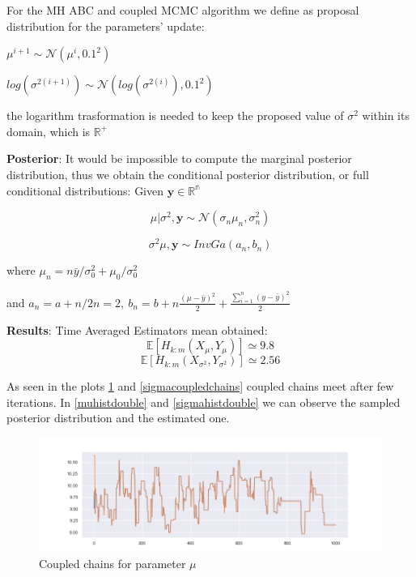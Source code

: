 \documentclass[11pt,a4paper,oneside]{report}
\begin{document}
For the MH ABC and coupled MCMC algorithm we define as proposal distribution for the parameters' update:
\begin{center}
	$ \mu^{i+1} \sim	\mathcal{N}( \mu^{i}, 0.1^2) $
	
	$ log(\sigma^{2(i+1)}) \sim \mathcal{N}( log(\sigma^{2(i)}), 0.1^2) $
\end{center}
the logarithm trasformation is needed to keep the proposed value of $ \sigma^2$ within its domain, 
which is $\mathbb{R^{+}}$


	
\textbf{Posterior}:
It would be impossible to compute the marginal posterior distribution, thus we obtain the conditional posterior distribution, or full conditional distributions:
Given $\mathbf{y} \in \mathbb{R^{n}} $

	
	$$ \mu| \sigma^2,\mathbf{y} \sim	\mathcal{N}( \sigma_n\mu_n, \sigma_n^2) $$
	
	$$ \sigma^{2} \mu,\mathbf{y} \sim InvGa( a_n,b_n)$$
	
	where $ \mu_n= n\bar y/\sigma_0^2 + \mu_0/\sigma_0^2$
		
and $a_n= a + n/2n=2, \  b_n=b + n\frac{(\mu-\bar y)^2}{2} +	\frac{\sum_{i=1}^n (y-\bar y)^2}2{} $


\textbf{Results}:
Time Averaged Estimators mean obtained:
$$ \mathbb{E}[H_{k:m}(X_{\mu}, Y_{\mu})] \simeq 9.8   %
$$
$$ \mathbb{E}[H_{k:m}(X_{\sigma^2}, Y_{\sigma^2})] \simeq 2.56   %
$$


As seen in the plots \ref{mucoupledchains} and \ref{sigmacoupledchains} coupled chains meet after few iterations.
In \ref{muhistdouble} and \ref{sigmahistdouble} we can observe the sampled posterior distribution and the estimated one.


\begin{figure}[h!]
	\centering
	\includegraphics[width=\textwidth]{doublecoupling_pack/doublecoupling_mu_chain_meeting}
	\caption{Coupled chains for parameter $\mu$ }   %
	\label{mucoupledchains}
\end{figure}
\end{document}
